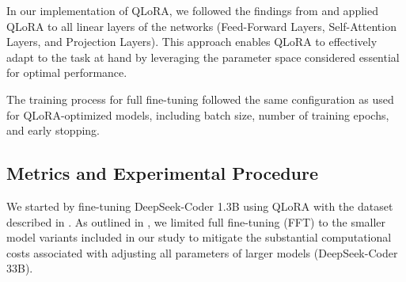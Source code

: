 
In our implementation of QLoRA, we followed the findings from \cite{dettmers2024qlora} and applied QLoRA to all linear layers of the networks (\eg Feed-Forward Layers, Self-Attention Layers, and Projection Layers). This approach enables QLoRA to effectively adapt to the task at hand by leveraging the parameter space considered essential for optimal performance.


The training process for full fine-tuning followed the same configuration as used for QLoRA-optimized models, including batch size, number of training epochs, and early stopping.





\subsection{Metrics and Experimental Procedure}
\label{sub:analysis}


We started by fine-tuning DeepSeek-Coder 1.3B using QLoRA with the dataset described in . As outlined in , we limited full fine-tuning (FFT) to the smaller model variants included in our study to mitigate the substantial computational costs associated with adjusting all parameters of larger models (\eg DeepSeek-Coder 33B).



